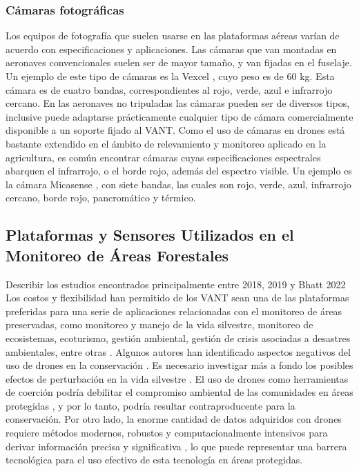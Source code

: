 \subsubsection{Cámaras fotográficas}
Los equipos de fotografía que suelen usarse en las plataformas aéreas varían de acuerdo con especificaciones y aplicaciones. Las cámaras que van montadas en aeronaves convencionales suelen ser de mayor tamaño, y van fijadas en el fuselaje. Un ejemplo de este tipo de cámaras es la Vexcel \cite{noauthor_ultracam_nodate}, cuyo peso es de 60 kg. Esta cámara es de cuatro bandas, correspondientes al rojo, verde, azul e infrarrojo cercano. En las aeronaves no tripuladas las cámaras pueden ser de diversos tipos, inclusive puede adaptarse prácticamente cualquier tipo de cámara comercialmente disponible a un soporte fijado al VANT. Como el uso de cámaras en drones está bastante extendido en el ámbito de relevamiento y monitoreo aplicado en la agricultura, es común encontrar cámaras cuyas especificaciones espectrales abarquen el infrarrojo, o el borde rojo, además del espectro visible. Un ejemplo es la cámara Micasense \cite{noauthor_altum-pt_2023}, con siete bandas, las cuales son rojo, verde, azul, infrarrojo cercano, borde rojo, pancromático y térmico.
 
\subsection{Plataformas y Sensores Utilizados en el Monitoreo de Áreas Forestales}

Describir los estudios encontrados principalmente entre 2018, 2019 y Bhatt 2022 
Los costos y flexibilidad han permitido de los VANT sean una de las plataformas preferidas para una serie de aplicaciones relacionadas con el monitoreo de áreas preservadas, como monitoreo y manejo de la vida silvestre, monitoreo de ecosistemas, ecoturismo, gestión ambiental,  gestión de crisis asociadas a desastres ambientales, entre otras \cite{jimenez_lopez_drones_2019}.
Algunos autores han identificado aspectos negativos del uso de drones en la conservación \cite{jimenez_lopez_drones_2019}. Es necesario investigar más a fondo los posibles efectos de perturbación en la vida silvestre \cite{millner_between_2024}. El uso de drones como herramientas de coerción podría debilitar el compromiso ambiental de las comunidades en áreas protegidas \cite{sandbrook_social_2015}, y por lo tanto, podría resultar contraproducente para la conservación. Por otro lado, la enorme cantidad de datos adquiridos con drones requiere métodos modernos, robustos y computacionalmente intensivos para derivar información precisa y significativa \cite{manfreda_use_2018}, lo que puede representar una barrera tecnológica para el uso efectivo de esta tecnología en áreas protegidas.


